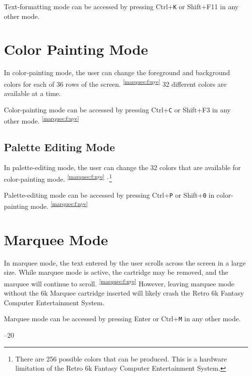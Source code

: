 \documentclass[12pt]{{memoir}}
\newcommand\dupfootnote[1]{%
\textsuperscript{\ref{#1}}}
\newcommand\sepfootnote{%
\textsuperscript{,\,}}
\begin{document}
Text-formatting mode can be accessed by pressing \textsf{Ctrl+}\texttt{K} or \textsf{Shift+F11} in any other mode.

\section{Color Painting Mode}

In color-painting mode, the user can change the foreground and background colors for each of 36 rows of the screen.\dupfootnote{marquee:f:nye} 32 different colors are available at a time.

Color-painting mode can be accessed by pressing \textsf{Ctrl+}\texttt{C} or \textsf{Shift+F3} in any other mode.\dupfootnote{marquee:f:nye}

\subsection{Palette Editing Mode}

In palette-editing mode, the user can change the 32 colors that are available for color-painting mode.\dupfootnote{marquee:f:nye}\sepfootnote\footnote{There are 256 possible colors that can be produced. This is a hardware limitation of the Retro 6k Fantasy Computer Entertainment System.}

Palette-editing mode can be accessed by pressing \textsf{Ctrl+}\texttt{P} or \textsf{Shift+}\texttt{0} in color-painting mode.\dupfootnote{marquee:f:nye}

\section{Marquee Mode}

In marquee mode, the text entered by the user scrolls across the screen in a large size. While marquee mode is active, the cartridge may be removed, and the marquee will continue to scroll.\dupfootnote{marquee:f:nye} However, leaving marquee mode without the 6k Marquee cartridge inserted will likely crash the Retro 6k Fantasy Computer Entertainment System.

Marquee mode can be accessed by pressing \textsf{Enter} or \textsf{Ctrl+}\texttt{M} in any other mode.

\cleartoverso
\pagestyle{empty}

\noindent\thetitle\hfill{}--20 \theauthor
\end{document}
